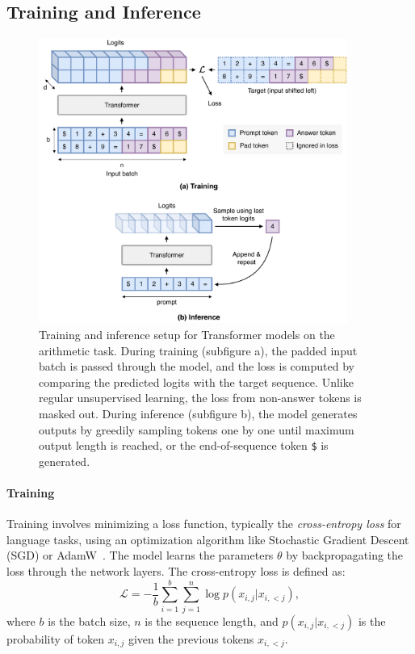 \subsection{Training and Inference}\label{subsec:training_inference}

\begin{figure}[h!]
    \centering
    \includegraphics[width=0.9\textwidth]{fig/training_and_inference.pdf}
    \caption{Training and inference setup for Transformer models on the arithmetic task. During training (subfigure a), the padded input batch is passed through the model, and the loss is computed by comparing the predicted logits with the target sequence. Unlike regular unsupervised learning, the loss from non-answer tokens is masked out. During inference (subfigure b), the model generates outputs by greedily sampling tokens one by one until maximum output length is reached, or the end-of-sequence token \texttt{\$} is generated.}
    \label{fig:transformer_training_inference}
\end{figure}

\paragraph{Training}
Training involves minimizing a loss function, typically the \emph{cross-entropy loss} for language tasks, using an optimization algorithm like Stochastic Gradient Descent (SGD) or AdamW~\parencite{loshchilov_decoupled_2018}. The model learns the parameters $\theta$ by backpropagating the loss through the network layers. The cross-entropy loss is defined as:
\begin{equation*}
    \mathcal{L} = -\frac{1}{b} \sum_{i=1}^{b} \sum_{j=1}^{n} \log p(x_{i,j} | x_{i,<j}),
\end{equation*}
where $b$ is the batch size, $n$ is the sequence length, and $p(x_{i,j} | x_{i,<j})$ is the probability of token $x_{i,j}$ given the previous tokens $x_{i,<j}$.

